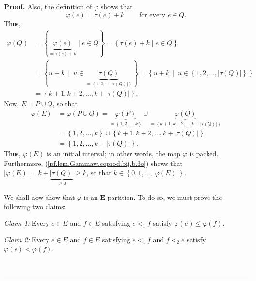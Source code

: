 \documentclass[numbers=enddot,12pt,final,onecolumn,notitlepage,abstracton]{scrartcl}
\theoremstyle{definition}
\newenvironment{proof}[1][Proof]{\noindent\textbf{#1.} }{\ \rule{0.5em}{0.5em}}
\newenvironment{verlong}{}{}
\newcommand{\EE}{{\mathbf{E}}}
\begin{document}
\begin{verlong}
\begin{proof}
Also, the definition of $\varphi$ shows that%
\begin{equation}
\varphi\left(  e\right)  =\tau\left(  e\right)
+k\ \ \ \ \ \ \ \ \ \ \text{for every }e\in Q.
\label{pf.lem.Gammaw.coprod.bij.b.2o}
\end{equation}
Thus,
\begin{align*}
\varphi\left(  Q\right)
& = \left\{ \underbrace{\varphi\left(e\right)}_{= \tau\left(e\right) + k}
\mid e \in Q \right\} = \left\{ \tau\left(e\right) + k \mid e \in Q \right\} \\
&  =\left\{  u+k\ \mid\ u\in\underbrace{\tau\left(
Q\right)  }_{=\left\{  1,2,\ldots,\left\vert \tau\left( Q \right)  \right\vert
\right\}  }\right\}  =\left\{  u+k\ \mid\ u\in\left\{  1,2,\ldots,\left\vert
\tau\left(  Q\right)  \right\vert \right\}  \right\} \\
&  =\left\{  k+1,k+2,\ldots,k+\left\vert \tau\left( Q \right)  \right\vert
\right\}  .
\end{align*}
Now, $E=P\cup Q$, so that%
\begin{align}
\varphi\left(  E\right)   &  =\varphi\left(  P\cup Q\right)
=\underbrace{\varphi\left(  P\right)  }_{=\left\{  1,2,\ldots,k\right\}  }%
\cup\underbrace{\varphi\left(  Q\right)  }_{=\left\{  k+1,k+2,\ldots
,k+\left\vert \tau\left( Q \right)  \right\vert \right\}  }\nonumber\\
&  =\left\{  1,2,\ldots,k\right\}  \cup\left\{  k+1,k+2,\ldots,k+\left\vert
\tau\left( Q \right)  \right\vert \right\}  \nonumber \\
&=  \left\{  1,2,\ldots,k+\left\vert
\tau\left( Q \right)  \right\vert \right\}  .
\label{pf.lem.Gammaw.coprod.bij.b.3o}%
\end{align}
Thus, $\varphi\left(  E\right)  $ is an initial interval; in other words, the
map $\varphi$ is packed. Furthermore, (\ref{pf.lem.Gammaw.coprod.bij.b.3o})
shows that $\left\vert \varphi\left(  E\right)  \right\vert
=k+\underbrace{\left\vert \tau\left( Q \right)  \right\vert }_{\geq0}\geq k$,
so that $k\in\left\{  0,1,\ldots,\left\vert \varphi\left(  E\right)
\right\vert \right\}  $.

We shall now show that $\varphi$ is an $\EE$-partition. To do so, we
must prove the following two claims:

\textit{Claim 1:} Every $e\in E$ and $f\in E$ satisfying $e<_{1}f$ satisfy
$\varphi\left(  e\right)  \leq\varphi\left(  f\right)  $.

\textit{Claim 2:} Every $e\in E$ and $f\in E$ satisfying $e<_{1}f$ and
$f<_{2}e$ satisfy $\varphi\left(  e\right)  <\varphi\left(  f\right)  $.


\end{proof}
\end{verlong}
\end{document}
